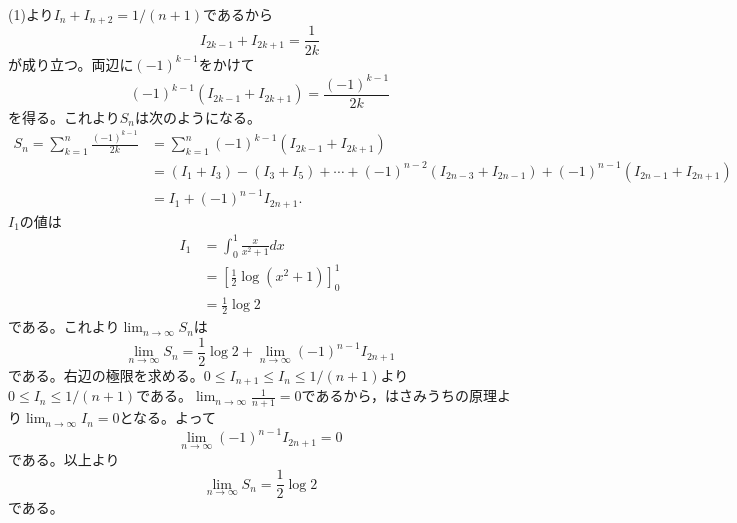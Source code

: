 \documentclass[../main]{subfiles}
\begin{document}
(1)より$I_{n}+I_{n+2}=1/(n+1)$であるから
\[I_{2k-1}+I_{2k+1}=\frac{1}{2k}\]
が成り立つ。両辺に$(-1)^{k-1}$をかけて
\[(-1)^{k-1}\left(I_{2 k-1}+I_{2 k+1}\right)=\frac{(-1)^{k-1}}{2 k}\]
を得る。これより$S_{n}$は次のようになる。
\[\begin{aligned}
  S_{n}=\sum_{k=1}^{n} \frac{(-1)^{k-1}}{2 k} &=\sum_{k=1}^{n}(-1)^{k-1}\left(I_{2 k-1}+I_{2 k+1}\right) \\
  &=\left(I_{1}+I_{3}\right)-\left(I_{3}+I_{5}\right)+\cdots+(-1)^{n-2}\left(I_{2 n-3}+I_{2 n-1}\right)+(-1)^{n-1}\left(I_{2 n-1}+I_{2 n+1}\right) \\
  &=I_{1}+(-1)^{n-1} I_{2 n+1}.
\end{aligned}\]
$I_{1}$の値は
\[\begin{aligned}
  I_{1} &=\int_{0}^{1} \frac{x}{x^{2}+1} d x \\
  &=\left[\frac{1}{2} \log \left(x^{2}+1\right)\right]_{0}^{1} \\
  &=\frac{1}{2} \log 2
\end{aligned}\]
である。これより$\displaystyle \lim _{n \rightarrow \infty} S_{n}$は
\[\lim _{n \rightarrow \infty} S_{n}=\frac{1}{2} \log 2+\lim _{n \rightarrow \infty}(-1)^{n-1} I_{2 n+1}\]
である。右辺の極限を求める。$0 \leq I_{n+1} \leq I_{n} \leq 1/(n+1)$より$0 \leq I_{n} \leq 1/(n+1)$である。$\displaystyle \lim _{n \rightarrow \infty} \frac{1}{n+1}=0$であるから，はさみうちの原理より$\displaystyle \lim _{n \rightarrow \infty} I_{n}=0$となる。よって
\[\lim _{n \rightarrow \infty}(-1)^{n-1} I_{2 n+1}=0\]
である。以上より
\[\lim _{n \rightarrow \infty} S_{n}=\frac{1}{2} \log 2\]
である。
\end{document}
